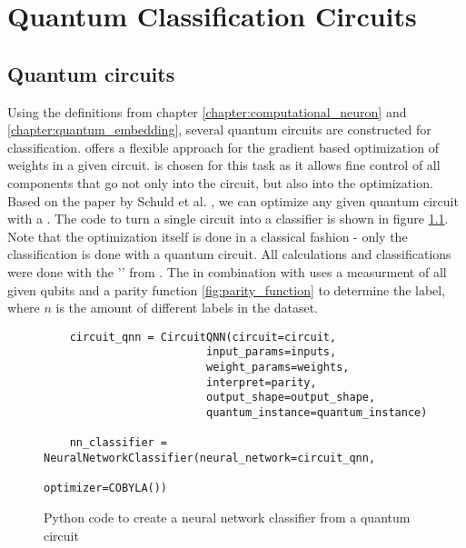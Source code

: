 
\chapter{Quantum Classification Circuits} %

\label{Chapter3}

\section{Quantum circuits}
\label{chapter:quantum_circuits}

Using the definitions from chapter \ref{chapter:computational_neuron} and \ref{chapter:quantum_embedding}, several quantum circuits are constructed for classification.  offers a flexible approach for the gradient based optimization of weights in a given circuit.  is chosen for this task as it allows fine control of all components that go not only into the circuit, but also into the optimization. Based on the paper by Schuld et al. \cite{schuld_evaluating_2019}, we can optimize any given quantum circuit with a \cite{qiskit_neural_nodate}. The code to turn a single circuit into a classifier is shown in figure \ref{fig:code_qnn}. Note that the optimization itself is done in a classical fashion - only the classification is done with a quantum circuit. All calculations and classifications were done with the '' from . The  in combination with  uses a measurment of all given qubits and a parity function \ref{fig:parity_function} to determine the label, where $n$ is the amount of different labels in the dataset.

\begin{figure}[!ht]
    \centering
    \begin{verbatim}
    circuit_qnn = CircuitQNN(circuit=circuit,    
                         input_params=inputs,
                         weight_params=weights,
                         interpret=parity,
                         output_shape=output_shape,
                         quantum_instance=quantum_instance)

    nn_classifier = NeuralNetworkClassifier(neural_network=circuit_qnn, 
                                            optimizer=COBYLA())
    \end{verbatim}
    \caption{Python code to create a neural network classifier from a quantum circuit}
    \label{fig:code_qnn}
\end{figure}

